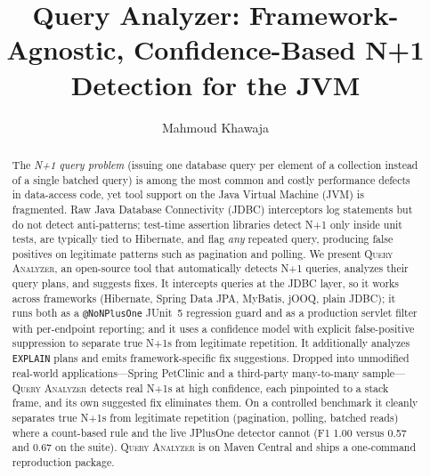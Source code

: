 \documentclass[sigplan,screen]{acmart}
\newcommand{\tool}{\textsc{Query Analyzer}}
\newcommand{\code}[1]{\texttt{\small #1}}
\begin{document}
\title{Query Analyzer: Framework-Agnostic, Confidence-Based
N+1 Detection for the JVM}

\author{Mahmoud Khawaja}

\begin{abstract}
The \emph{N+1 query problem} (issuing one database query per element of a
collection instead of a single batched query) is among the most common and
costly performance defects in data-access code, yet tool support on the Java
Virtual Machine (JVM) is fragmented. Raw Java Database Connectivity (JDBC)
interceptors log statements but do not detect anti-patterns;
test-time assertion libraries detect N+1 only inside unit tests, are typically
tied to Hibernate, and flag \emph{any} repeated query, producing false positives
on legitimate patterns such as pagination and polling. We present \tool, an
open-source tool that automatically detects N+1 queries, analyzes their query
plans, and suggests fixes. It intercepts queries at the JDBC layer,
so it works across frameworks (Hibernate, Spring Data JPA, MyBatis, jOOQ, plain
JDBC); it runs both as a \code{@NoNPlusOne} JUnit~5 regression guard and as a
production servlet filter with per-endpoint reporting; and it uses a
confidence model with explicit false-positive suppression to separate true N+1s
from legitimate repetition. It additionally analyzes \texttt{EXPLAIN} plans and
emits framework-specific fix suggestions. Dropped into unmodified real-world
applications---Spring PetClinic and a third-party many-to-many sample---\tool{}
detects real N+1s at high confidence, each pinpointed to a stack frame, and its
own suggested fix eliminates them. On a controlled benchmark it cleanly separates
true N+1s from legitimate repetition (pagination, polling, batched reads) where a
count-based rule and the live JPlusOne detector cannot (F1 1.00 versus 0.57 and
0.67 on the suite). \tool{} is on Maven Central and ships a one-command
reproduction package.
\end{abstract}

\maketitle

\end{document}
